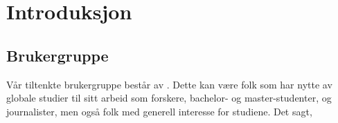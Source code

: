 \section{Introduksjon}

\subsection{Brukergruppe}
Vår tiltenkte brukergruppe består av . Dette kan være folk som har nytte av globale studier til sitt arbeid som forskere, bachelor- og master-studenter, og journalister, men også folk med generell interesse for studiene. Det sagt, 


